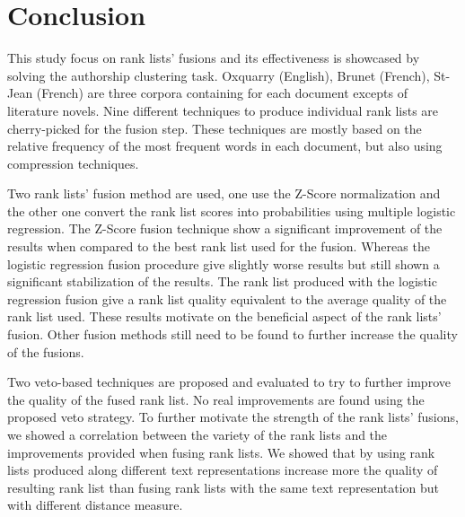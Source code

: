\section{Conclusion \label{sec:conclusion}}

This study focus on rank lists' fusions and its effectiveness is showcased by solving the authorship clustering task.
Oxquarry (English), Brunet (French), St-Jean (French) are three corpora containing for each document excepts of literature novels.
Nine different techniques to produce individual rank lists are cherry-picked for the fusion step.
These techniques are mostly based on the relative frequency of the most frequent words in each document, but also using compression techniques.

Two rank lists' fusion method are used, one use the Z-Score normalization and the other one convert the rank list scores into probabilities using multiple logistic regression.
The Z-Score fusion technique show a significant improvement of the results when compared to the best rank list used for the fusion.
Whereas the logistic regression fusion procedure give slightly worse results but still shown a significant stabilization of the results.
The rank list produced with the logistic regression fusion give a rank list quality equivalent to the average quality of the rank list used.
These results motivate on the beneficial aspect of the rank lists' fusion.
Other fusion methods still need to be found to further increase the quality of the fusions.

Two veto-based techniques are proposed and evaluated to try to further improve the quality of the fused rank list.
No real improvements are found using the proposed veto strategy.
To further motivate the strength of the rank lists' fusions, we showed a correlation between the variety of the rank lists and the improvements provided when fusing rank lists.
We showed that by using rank lists produced along different text representations increase more the quality of resulting rank list than fusing rank lists with the same text representation but with different distance measure.

